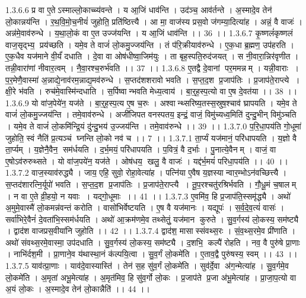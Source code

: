 1.3.6.6
प्र वा ए॒तेऽस्माल्लो॒काच्च्य॑वन्ते । य आ॒जिं धाव॑न्ति । उद॑ञ्च॒ आव॑र्तन्ते । अ॒स्मादे॒व तेन॑ लो॒कान्नय॑न्ति । र॒थ॒वि॒मो॒च॒नीयं॑ जुहोति॒ प्रति॑ष्ठित्त्यै । आ मा॒ वाज॑स्य प्रस॒वो ज॑गम्या॒दित्या॑ह । अन्नं॒ वै वाजः॑ । अन्न॑मे॒वाव॑रुन्धे । य॒था॒लो॒कं वा ए॒त उज्ज॑यन्ति । य आ॒जिं धाव॑न्ति ।। 36 ।।
1.3.6.7
कृ॒ष्णलं॑कृष्णलं वाज॒सृद्भ्य॒ प्रय॑च्छति । यमे॒व ते वाजं॑ लो॒कमु॒ज्जय॑न्ति । तं प॑रि॒क्रीयाव॑रुन्धे । ए॒क॒धा ब्र॒ह्मण॒ उप॑हरति । ए॒क॒धैव यज॑माने वी॒र्यं॑ दधाति । दे॒वा वा ओष॑धीष्वा॒जिम॑युः । ता बृह॒स्पति॒रुद॑जयत् । स नी॒वारा॒न्निर॑वृणीत । तन्नी॒वारा॑णां नीवार॒त्वम् । नै॒वा॒रश्च॒रुर्भ॑वति ।। 37 ।।
1.3.6.8
ए॒तद्वै दे॒वानां पर॒ममन्नम् । यन्नी॒वाराः । प॒र॒मेणै॒वास्मा॑ अ॒न्नाद्ये॒नाव॑रम॒न्नाद्य॒मव॑रुन्धे । स॒प्तद॑शशरावो भवति । स॒प्त॒द॒श प्र॒जाप॑तिः । प्र॒जाप॑ते॒राप्त्ये । क्षी॒रे भ॑वति । रुच॑मे॒वास्मि॑न्दधाति । स॒र्पिष्वान्भवति मेध्य॒त्वाय॑ । बा॒र्॒ह॒स्प॒त्यो वा ए॒ष दे॒वत॑या ।। 38 ।।
1.3.6.9
यो वा॑ज॒पेये॑न॒ यज॑ते । बा॒र्॒ह॒स्प॒त्य ए॒ष च॒रुः । अश्वान्थ्सरिष्य॒तस्स॒स्रुष॒श्चाव॑ घ्रापयति । यमे॒व ते वाजं॑ लो॒कमु॒ज्जय॑न्ति । तमे॒वाव॑रुन्धे । अजी॑जिपत वनस्पतय॒ इन्द्रं॒ वाजं॒ विमु॑च्यध्व॒मिति॑ दुन्दु॒भीन् विमु॑ञ्चति । यमे॒व ते वाजं॑ लो॒कमि॑न्द्रि॒यं दु॑न्दु॒भय॑ उ॒ज्जय॑न्ति । तमे॒वाव॑रुन्धे ।। 39 ।।
1.3.7.0
प॒रि॒धा॒पय॑ति गो॒धूमा॑ जुहोति॒ स्वं नैति॑ प्र॒त्यञ्चं घ्नन्ति लो॒को नव॑ च ।। 7 ।।
1.3.7.1
ता॒र्प्यं यज॑मानं॒ परि॑धापयति । य॒ज्ञो वै ता॒र्प्यम् । य॒ज्ञेनै॒वैन॒॒ सम॑र्धयति । द॒र्भ॒मयं॒ परि॑धापयति । प॒वित्रं॒ वै द॒र्भाः । पु॒नात्ये॒वैनम् । वाजं॒ वा ए॒षोऽव॑रुरुथ्सते । यो वा॑ज॒पये॑न॒ यज॑ते । ओष॑धय॒ खलु॒ वै वाजः॑ । यद्द॑र्भ॒मयं॑ परिधा॒पय॑ति ।। 40 ।।
1.3.7.2
वाज॒स्याव॑रुद्ध्यै । जाय॒ एहि॒ सुवो॒ रोहा॒वेत्या॑ह । पत्नि॑या ए॒वैष य॒ज्ञस्यान्वार॒म्भोऽन॑वच्छित्त्यै । स॒प्तद॑शारत्नि॒र्यूपो॑ भवति । स॒प्त॒द॒श प्र॒जाप॑तिः । प्र॒जाप॑ते॒राप्त्यै । तू॒प॒रश्चतु॑रश्रिर्भवति । गौ॒धू॒मं च॒षालम् । न वा ए॒ते व्री॒हयो॒ न यवाः । यद्गो॒धूमाः ।। 41 ।।
1.3.7.3
ए॒वमि॑व॒ हि प्र॒जाप॑ति॒स्समृ॑द्ध्यै । अथो॑ अ॒मुमे॒वास्मै॑ लो॒कमन्न॑वन्तं करोति । वासो॑भिर्वेष्टयति । ए॒ष वै यज॑मानः । यद्यूपः॑ । स॒र्व॒दे॒व॒त्यं॑ वासः॑ । सर्वा॑भिरे॒वैनं॑ दे॒वता॑भि॒स्सम॑र्धयति । अथो॑ आ॒क्रम॑णमे॒व तथ्सेतुं॒ यज॑मान कुरुते । सु॒व॒र्गस्य॑ लो॒कस्य॒ सम॑ष्ट्यै । द्वाद॑श वाजप्रस॒वीया॑नि जुहोति ।। 42 ।।
1.3.7.4
द्वाद॑श॒ मासास्संवथ्स॒रः । सं॒व॒थ्स॒रमे॒व प्री॑णाति । अथो॑ संवथ्स॒रमे॒वास्मा॒ उप॑दधाति । सु॒व॒र्गस्य॑ लो॒कस्य॒ सम॑ष्ट्यै । द॒शभि॒ कल्पै॑ रोहति । नव॒ वै पुरु॑षे प्रा॒णाः । नाभि॑र्दश॒मी । प्रा॒णाने॒व य॑थास्था॒नं क॑ल्पयि॒त्वा । सु॒व॒र्गं लो॒कमे॑ति । ए॒ताव॒द्वै पुरु॑षस्य॒ स्वम् ।। 43 ।।
1.3.7.5
याव॑त्प्रा॒णाः । याव॑दे॒वास्यास्ति॑ । तेन॑ स॒ह सु॑व॒र्गं लो॒कमे॑ति । सुव॑र्दे॒वा अ॑ग॒न्मेत्या॑ह । सु॒व॒र्गमे॒व लो॒कमे॑ति । अ॒मृता॑ अभू॒मेत्या॑ह । अ॒मृत॑मिव॒ हि सु॑व॒र्गो लो॒कः । प्र॒जाप॑ते प्र॒जा अ॑भू॒मेत्या॑ह । प्रा॒जा॒प॒त्यो वा अ॒यं लो॒कः । अ॒स्मादे॒व तेन॑ लो॒कान्नैति॑ ।। 44 ।।
